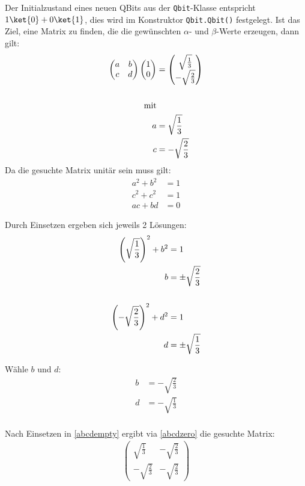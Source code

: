 Der Initialzustand eines neuen QBits aus der \texttt{Qbit}-Klasse entspricht $1\ket{0}+0\ket{1}$, dies wird im Konstruktor \texttt{Qbit.Qbit()} festgelegt.
Ist das Ziel, eine Matrix zu finden, die die gewünschten $\alpha$- und $\beta$-Werte erzeugen, dann gilt: 
\begin{align}
    \begin{pmatrix}
        a & b \\
        c & d
    \end{pmatrix}
    \begin{pmatrix}
       1  \\
       0 
    \end{pmatrix}
    &=
    \begin{pmatrix}
       \sqrt{\frac{1}{3}} \label{abcdempty} \\
       -\sqrt{\frac{2}{3}} 
    \end{pmatrix} \\
    \notag \\
    \text{mit}\notag \\
    a &= \sqrt{\frac{1}{3}} \\
    c &= -\sqrt{\frac{2}{3}} 
\end{align}
Da die gesuchte Matrix unitär sein muss \cite[265]{SutorDancing} gilt:
\begin{align}
    a^2 + b^2 &= 1 \\
    c^2 + c^2 &= 1 \\
    ac + bd &= 0 \label{abcdzero}
\end{align}

Durch Einsetzen ergeben sich jeweils 2 Lösungen:
\begin{align}
    \left( \sqrt{\frac{1}{3}} \right)^2 + b^2 &= 1 \\
    b &= \pm \sqrt{\frac{2}{3}} \\
    \notag\\
    \left( -\sqrt{\frac{2}{3}} \right)^2 + d^2 &= 1 \\
    d &= \pm \sqrt{\frac{1}{3}}
\end{align}

Wähle $b$ und $d$:
\begin{align}
    b &= -\sqrt{\frac{2}{3}} \\ 
    d &= -\sqrt{\frac{1}{3}} \\ 
\end{align}

Nach Einsetzen in \ref{abcdempty} ergibt via \ref{abcdzero} die gesuchte Matrix: 
\begin{align}
    \begin{pmatrix}
        \sqrt{\frac{1}{3}} & -\sqrt{\frac{2}{3}} \\
        -\sqrt{\frac{2}{3}} & -\sqrt{\frac{2}{3}} 
    \end{pmatrix}
\end{align}


